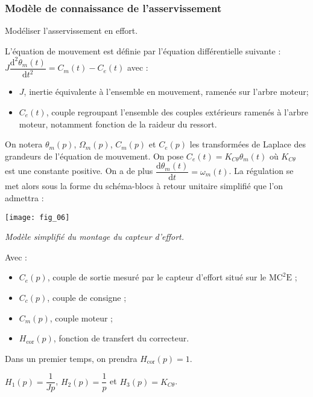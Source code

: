 \begin{multicols}{2}
\subsubsection*{Modèle de connaissance de l'asservissement}

\begin{obj}
Modéliser l’asservissement en effort.
\end{obj}

\ifprof
\else

L’équation de mouvement est définie par l’équation différentielle suivante : 
$J\dfrac{\text{d}^2\theta_m(t)}{\text{d}t^2}=C_m(t)-C_e(t)$  avec :
\begin{itemize}
\item $J$, inertie équivalente à l’ensemble en mouvement, ramenée sur l’arbre moteur;
\item $C_e(t)$, couple regroupant l’ensemble des couples extérieurs ramenés à l’arbre moteur, notamment fonction de la raideur du ressort.
\end{itemize}


On notera $\theta_m(p)$, $\Omega_m(p)$, $C_m(p)$ et $C_e(p)$ les transformées de Laplace des grandeurs de l’équation de mouvement.
On pose $C_e(t)=K_{C\theta}\theta_m(t)$ où  $K_{C\theta}$ est une constante positive. On a de plus $\dfrac{\text{d}\theta_m(t)}{\text{d}t}=\omega_m(t)$. La régulation se met alors sous la forme du schéma-blocs à retour unitaire simplifié que l’on
admettra :

\begin{center}
\texttt{[image: fig\_06]}

\textit{Modèle simplifié du montage du capteur d’effort.}
\end{center}

Avec :
\begin{itemize}
\item $C_e(p)$, couple de sortie mesuré par le capteur d’effort situé sur le $\text{MC}^2\text{E}$ ;
\item $C_c(p)$, couple de consigne ;
\item $C_m(p)$, couple moteur ;
\item $H_{\text{cor}}(p)$, fonction de transfert du correcteur.
\end{itemize}
Dans un premier temps, on prendra $H_{\text{cor}}(p)=1$.
\fi

\ifprof
\begin{corrige}
$H_1(p)=\dfrac{1}{Jp}$, $H_2(p)=\dfrac{1}{p}$ et $H_3(p)=K_{C\theta}$.
\end{corrige}
\else
\fi


\end{multicols}

